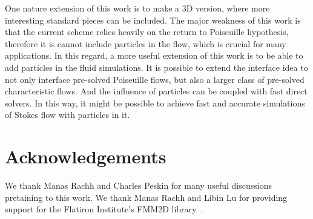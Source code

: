 \documentclass[10pt,twocolumn,letterpaper]{article}
\begin{document}
One nature extension of this work is to make a 3D version, 
where more interesting standard pieces can be included.
The major weakness of this work is that the current scheme relies heavily 
on the return to Poiseuille hypothesis, therefore it is cannot
include particles in the flow, which is crucial for many applications. 
In this regard, a more useful extension of this work is to be able to add particles in the fluid simulations. 
It is possible to extend the interface idea to not only interface pre-solved Poiseuille flows, 
but also a larger class of pre-solved characteristic flows. 
And the influence of particles can be coupled with fast direct solvers.
In this way, it might be possible to achieve fast and accurate simulations of 
Stokes flow with particles in it. 


\section*{Acknowledgements\label{sec:acknowledgements}}

We thank Manas Rachh and Charles Peskin for many useful discussions pretaining to this work. 
We thank Manas Rachh and Libin Lu for providing support for the Flatiron Institute's FMM2D library~\cite{FlatironinstituteFmm2d2022}.



\end{document}
